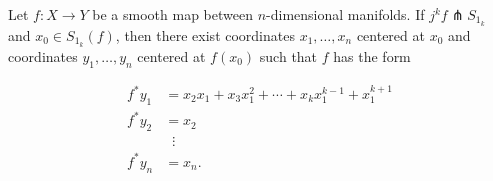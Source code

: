 Let $f: X \to Y$ be a smooth map between $n$-dimensional manifolds. If $j^k f \pitchfork S_{1_k}$ and $x_0 \in S_{1_k}(f)$, then there exist coordinates $x_1, \ldots, x_n$ centered at $x_0$ and coordinates $y_1, \ldots, y_n$ centered at $f(x_0)$ such that $f$ has the form

$$
\begin{align*}
f^* y_1 &= x_2 x_1 + x_3 x_1^2 + \cdots + x_k x_1^{k-1} + x_1^{k+1} \\
f^* y_2 &= x_2 \\
&\;\;\vdots \\
f^* y_n &= x_n.
\end{align*}
$$
